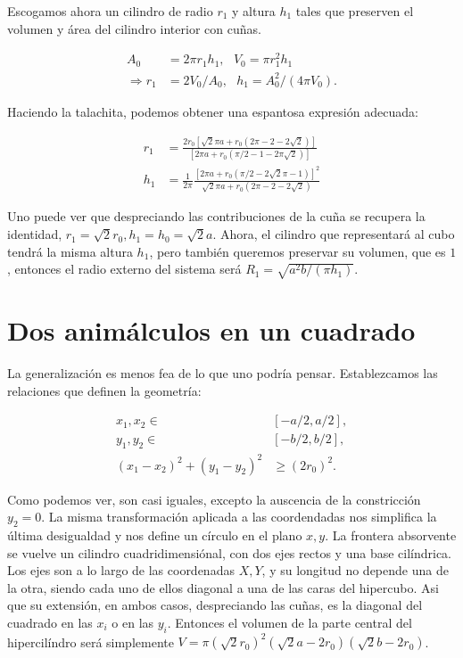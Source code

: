 \documentclass[letterpaperr,12pt]{article}
\begin{document}
Escogamos ahora un cilindro de radio $r_1$ y altura $h_1$ tales
que preserven el volumen y área del cilindro interior con cuñas.

\begin{align}
A_0 & = 2\pi r_1 h_1, \text{ } V_0 = \pi r_1^2 h_1 \\
\Rightarrow r_1 & = 2V_0/A_0, \text{ }h_1  =  A_0^2/(4 \pi V_0 ).  
\end{align}

Haciendo la talachita, podemos obtener una espantosa expresión adecuada:

\begin{align}
 r_1 & = \frac{2 r_0 [\sqrt{2} \pi a + r_0(2 \pi - 2 - 2 \sqrt{2})]}
 {[2 \pi a + r_0 (\pi/2 - 1 - 2\pi \sqrt{2})] } \\
h_1 & = \frac{1}{2\pi}
\frac{[2\pi a + r_0 (\pi/2 -2 \sqrt{2}\pi-1)]^2 }
{\sqrt{2} \pi a + r_0(2 \pi -2 - 2 \sqrt{2}) }
\end{align}

Uno puede ver que despreciando las contribuciones de la cuña se recupera
la identidad, $r_1= \sqrt{2} r_0, h_1=h_0=\sqrt{2} a $. 
Ahora, el cilindro que representará 
al cubo tendrá la misma altura $h_1$, pero también queremos preservar
su volumen, que es $1$, entonces el radio externo del sistema será
$R_1=\sqrt{a ^2 b /(\pi h_1)}$. 

\section{Dos animálculos en un cuadrado}

La generalización es menos fea de lo que uno podría pensar.
Establezcamos las relaciones que definen la geometría:

\begin{align}
x_1,x_2 \in  & [ -a/2, a/2], \\
y_1, y_2\in & [ -b/2, b/2], \\
(x_1-x_2)^2+(y_1-y_2)^2 & \ge (2 r_0)^2.
\end{align}

Como podemos ver, son casi iguales, excepto la auscencia de la
constricción $y_2=0$. La misma transformación aplicada a 
las coordendadas nos simplifica la última desigualdad
y nos define un círculo en el plano $x,y$. La frontera
absorvente se vuelve un cilindro cuadridimensiónal, con
dos ejes rectos y una base cilíndrica. Los ejes son a lo largo de
las coordenadas $X,Y$, y su longitud no depende una de la otra, siendo
cada uno de ellos diagonal a una de las caras del hipercubo. Asi
que su extensión, en ambos casos, despreciando las cuñas, es la
diagonal del cuadrado en las $x_i$ o en las $y_i$.
Entonces el volumen de la
parte central del hipercilíndro será simplemente
$V=\pi (\sqrt{2} r_0)^2 (\sqrt{2}a-2 r_0) (\sqrt{2}b-2 r_0) $.
\end{document}
